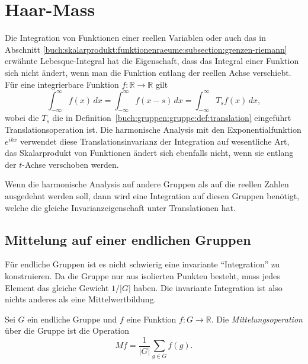 %
%
%
\section{Haar-Mass
\label{buch:gruppen:section:haar}}
Die Integration von Funktionen einer reellen Variablen oder auch
das in Abschnitt
\ref{buch:skalarprodukt:funktionenraeume:subsection:grenzen-riemann}
erwähnte Lebesque-Integral hat die Eigenschaft, dass das
Integral einer Funktion sich nicht ändert, wenn man die Funktion
entlang der reellen Achse verschiebt.
Für eine integrierbare Funktion $f\colon\mathbb{R}\to\mathbb{R}$
gilt
\[
\int_{-\infty}^\infty f(x)\,dx
=
\int_{-\infty}^\infty f(x-s)\,dx
=
\int_{-\infty}^\infty T_sf(x)\,dx,
\]
wobei die $T_s$ die in Definition~\ref{buch:gruppen:gruppe:def:translation}
eingeführt Translationsoperation ist.
Die harmonische Analysis mit den Exponentialfunktion $e^{ikx}$ 
verwendet diese Translationsinvarianz der Integration auf wesentliche Art,
das Skalarprodukt von Funktionen ändert sich ebenfalls nicht, wenn sie
entlang der $t$-Achse verschoben werden.

Wenn die harmonische Analysis auf andere Gruppen als auf die reellen
Zahlen ausgedehnt werden soll, dann wird eine Integration auf diesen
Gruppen benötigt, welche die gleiche Invarianzeigenschaft unter
Translationen hat.

%
%
\subsection{Mittelung auf einer endlichen Gruppen
\label{buch:haar:subsection:endlich}}
Für endliche Gruppen ist es nicht schwierig eine invariante
``Integration'' zu konstruieren.
Da die Gruppe nur aus isolierten Punkten besteht, muss jedes Element das 
gleiche Gewicht $1/|G|$ haben.
Die invariante Integration ist also nichts anderes als eine
Mittelwertbildung.

\begin{definition}[Mittelung]
\label{buch:gruppen:haar:def:mittelung}
Sei $G$ ein endliche Gruppe und $f$ eine Funktion $f\colon G\to \mathbb{R}$.
Die {\em Mittelungsoperation} über die Gruppe ist die Operation
\[
Mf = \frac{1}{|G|}\sum_{g\in G} f(g).
\]
\end{definition}

